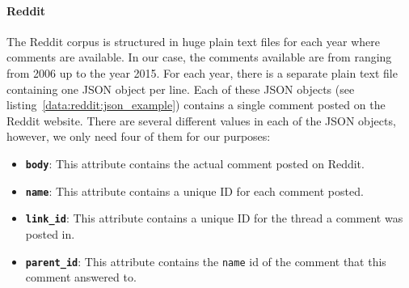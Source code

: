 \paragraph{Reddit} The Reddit corpus is structured in huge plain text files for each year where comments are available. In our case, the comments available are from ranging from 2006 up to the year 2015. For each year, there is a separate plain text file containing one JSON object per line. Each of these JSON objects (see listing~\ref{data:reddit:json_example}) contains a single comment posted on the Reddit website. There are several different values in each of the JSON objects, however, we only need four of them for our purposes: 

\begin{itemize}[noitemsep]
	\item \textbf{\texttt{body}}: This attribute contains the actual comment posted on Reddit.
	\item \textbf{\texttt{name}}: This attribute contains a unique ID for each comment posted.
	\item \textbf{\texttt{link\_id}}: This attribute contains a unique ID for the thread a comment was posted in.
	\item \textbf{\texttt{parent\_id}}: This attribute contains the \texttt{name} id of the comment that this comment answered to.
\end{itemize}

